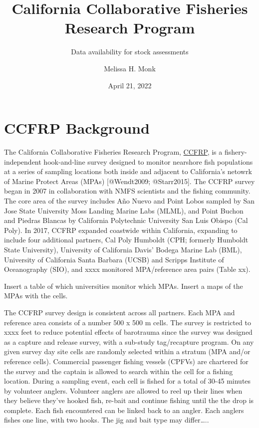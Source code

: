 \documentclass[
]{article}
\title{California Collaborative Fisheries Research Program}
\subtitle{Data availability for stock assessments}
\author{Melissa H. Monk}
\date{April 21, 2022}
\begin{document}
\maketitle

\hypertarget{ccfrp-background}{%
\section{CCFRP Background}\label{ccfrp-background}}

The California Collaborative Fisheries Research Program,
\href{https://www.mlml.calstate.edu/ccfrp/}{CCFRP},
is a fishery-independent hook-and-line survey designed to monitor nearshore fish
populations at a series of sampling
locations both inside and adjacent to California's netowrk of Marine Protect Areas
(MPAs) {[}@Wendt2009; @Starr2015{]}. The CCFRP survey began in 2007 in collaboration
with NMFS scientists and the fishing community. The core area of the survey includes
Año Nuevo and Point Lobos sampled by San Jose State University Moss Landing
Marine Labs (MLML), and Point Buchon and Piedras Blancas by California Polytechnic University
San Luis Obispo (Cal Poly). In 2017, CCFRP expanded coastwide within California, expanding
to include four additional partners, Cal Poly Humboldt (CPH; formerly Humboldt State
University), University of California Davis' Bodega Marine Lab (BML), University
of California Santa Barbara (UCSB) and Scripps Institute of Oceanography (SIO), and
xxxx monitored MPA/reference area pairs (Table xx).

Insert a table of which universities monitor which MPAs. Insert a maps of the
MPAs with the cells.

The CCFRP survey design is consistent across all partners. Each MPA and reference
area consists of a number 500 x 500 m cells. The survey is restricted to xxxx feet
to reduce potential effects of barotrauma since the survey was designed as a capture
and release survey, with a sub-study tag/recapture program. On any given survey day site cells
are randomly selected within a stratum (MPA and/or reference cells). Commercial
passenger fishing vessels (CPFVs) are chartered for the survey and the captain
is allowed to search within the cell for a fishing location. During a sampling
event, each cell is fished for a total of 30-45 minutes by volunteer anglers. Volunteer
anglers are allowed to reel up their lines when they believe they've hooked fish,
re-bait and continue fishing until the the drop is complete. Each fish encountered
can be linked back to an angler. Each anglers fishes one line, with two hooks.
The jig and bait type may differ\ldots..
\end{document}
